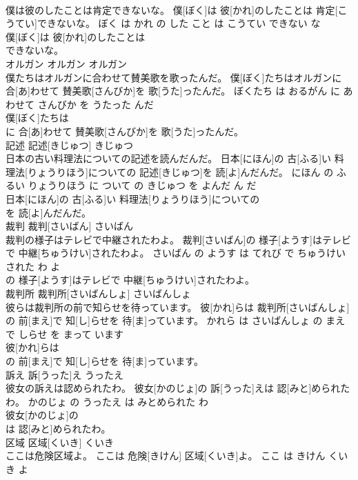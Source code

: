 \documentclass[8pt]{extreport}
\begin{document}
\begin{CJK}{UTF8}{min}
\\	僕は彼のしたことは肯定できないな。	僕[ぼく]は 彼[かれ]のしたことは 肯定[こうてい]できないな。	ぼく は かれ の した こと は こうてい できない な	
\\	僕[ぼく]は 彼[かれ]のしたことは
\\	できないな。			
\\	オルガン	オルガン	オルガン	
\\	僕たちはオルガンに合わせて賛美歌を歌ったんだ。	僕[ぼく]たちはオルガンに 合[あ]わせて 賛美歌[さんびか]を 歌[うた]ったんだ。	ぼくたち は おるがん に あわせて さんびか を うたった んだ	
\\	僕[ぼく]たちは
\\	に 合[あ]わせて 賛美歌[さんびか]を 歌[うた]ったんだ。			
\\	記述	記述[きじゅつ]	きじゅつ	
\\	日本の古い料理法についての記述を読んだんだ。	日本[にほん]の 古[ふる]い 料理法[りょうりほう]についての 記述[きじゅつ]を 読[よ]んだんだ。	にほん の ふるい りょうりほう に ついて の きじゅつ を よんだ ん だ	
\\	日本[にほん]の 古[ふる]い 料理法[りょうりほう]についての
\\	を 読[よ]んだんだ。			
\\	裁判	裁判[さいばん]	さいばん	
\\	裁判の様子はテレビで中継されたわよ。	裁判[さいばん]の 様子[ようす]はテレビで 中継[ちゅうけい]されたわよ。	さいばん の ようす は てれび で ちゅうけい された わ よ	
\\	の 様子[ようす]はテレビで 中継[ちゅうけい]されたわよ。			
\\	裁判所	裁判所[さいばんしょ]	さいばんしょ	
\\	彼らは裁判所の前で知らせを待っています。	彼[かれ]らは 裁判所[さいばんしょ]の 前[まえ]で 知[し]らせを 待[ま]っています。	かれら は さいばんしょ の まえ で しらせ を まって います	
\\	彼[かれ]らは
\\	の 前[まえ]で 知[し]らせを 待[ま]っています。			
\\	訴え	訴[うった]え	うったえ	
\\	彼女の訴えは認められたわ。	彼女[かのじょ]の 訴[うった]えは 認[みと]められたわ。	かのじょ の うったえ は みとめられた わ	
\\	彼女[かのじょ]の
\\	は 認[みと]められたわ。			
\\	区域	区域[くいき]	くいき	
\\	ここは危険区域よ。	ここは 危険[きけん] 区域[くいき]よ。	ここ は きけん くいき よ	

\end{CJK}
\end{document}
